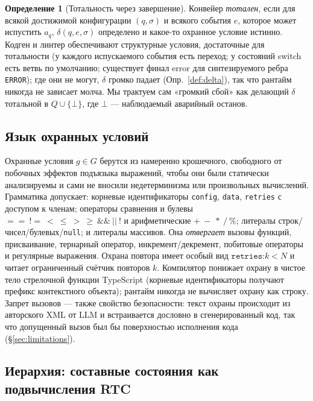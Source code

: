 \documentclass[11pt]{article}
\theoremstyle{plain}
\theoremstyle{definition}
\newtheorem{definition}[theorem]{Определение}
\theoremstyle{remark}
\newcommand{\code}[1]{\texttt{#1}}
\newcommand{\state}[1]{\textsf{#1}}
\newcommand{\transition}{\ensuremath{\delta}}
\begin{document}
\begin{definition}[Тотальность через завершение]\label{def:total}
Конвейер \emph{тотален}, если для всякой достижимой конфигурации $(q,\sigma)$ и всякого
события $e$, которое может испустить $a_q$, $\transition(q,e,\sigma)$ определено и
какое-то охранное условие истинно. Кодген и линтер обеспечивают структурные условия,
достаточные для тотальности (у каждого испускаемого события есть переход; у состояний
\state{switch} есть ветвь по умолчанию; существует финал \state{error} для
синтезируемого ребра \code{ERROR}); где они не могут, $\transition$ громко падает
(Опр.~\ref{def:delta}), так что рантайм никогда не зависает молча. Мы трактуем сам «громкий
сбой» как делающий $\transition$ тотальной в $Q \cup \{\bot\}$, где $\bot$ ---
наблюдаемый аварийный останов.
\end{definition}

\subsection{Язык охранных условий}\label{sec:guards}

Охранные условия $g \in G$ берутся из намеренно крошечного, свободного от побочных
эффектов подъязыка выражений, чтобы они были статически анализируемы и сами не вносили
недетерминизма или произвольных вычислений. Грамматика допускает: корневые идентификаторы
\code{config}, \code{data}, \code{retries} с доступом к членам; операторы сравнения и
булевы ${==}\ {!=}\ {<}\ {\le}\ {>}\ {\ge}\ \&\&\ \vert\vert\ !$ и арифметические
${+}\ {-}\ {*}\ {/}\ \%$; литералы строк/чисел/булевых/\code{null}; и литералы массивов.
Она \emph{отвергает} вызовы функций, присваивание, тернарный оператор,
инкремент/декремент, побитовые операторы и регулярные выражения. Охрана повтора имеет
особый вид $\code{retries:}k < N$ и читает ограниченный счётчик повторов $k$. Компилятор
понижает охрану в чистое тело стрелочной функции TypeScript (корневые идентификаторы
получают префикс контекстного объекта); рантайм никогда не вычисляет охрану как строку.
Запрет вызовов --- также свойство безопасности: текст охраны происходит из авторского XML
от LLM и встраивается дословно в сгенерированный код, так что допущенный вызов был бы
поверхностью исполнения кода (\S\ref{sec:limitations}).

\subsection{Иерархия: составные состояния как подвычисления RTC}
\end{document}
